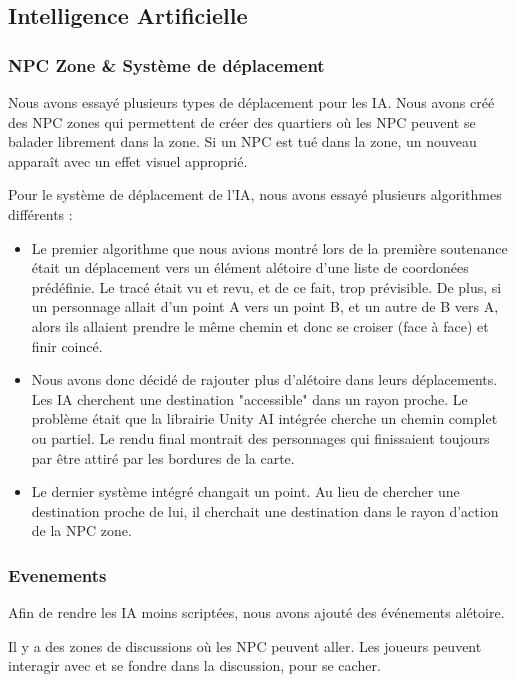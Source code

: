 

\subsection{Intelligence Artificielle}
    \subsubsection{NPC Zone \& Système de déplacement}
    Nous avons essayé plusieurs types de déplacement pour les IA.
    Nous avons créé des NPC zones qui permettent de créer des quartiers
    où les NPC peuvent se balader librement dans la zone.
    Si un NPC est tué dans la zone, un nouveau apparaît avec un effet visuel approprié.

    Pour le système de déplacement de l'IA,
    nous avons essayé plusieurs algorithmes différents :\newline
    
    \begin{itemize}
        \item Le premier algorithme que nous avions montré lors de la première soutenance
        était un déplacement vers un élément alétoire d'une liste de coordonées prédéfinie.
        Le tracé était vu et revu, et de ce fait, trop prévisible.
        De plus, si un personnage allait d'un point A vers un point B, et un autre de B vers A,
        alors ils allaient prendre le même chemin et donc se croiser (face à face) et finir coincé.
        \newline
        \item  Nous avons donc décidé de rajouter plus d'alétoire dans leurs déplacements.
        Les IA cherchent une destination "accessible" dans un rayon proche.
        Le problème était que la librairie Unity AI intégrée cherche un chemin complet ou partiel.
        Le rendu final montrait des personnages qui finissaient toujours par être attiré par les bordures de la carte.
        \newline

        \item    Le dernier système intégré changait un point.
        Au lieu de chercher une destination proche de lui, il cherchait une destination dans le rayon
        d'action de la NPC zone.
    
    \end{itemize}
    
   
    
    \subsubsection{Evenements}

    Afin de rendre les IA moins scriptées, nous avons ajouté des événements alétoire.
    
    Il y a des zones de discussions où les NPC peuvent aller.
    Les joueurs peuvent interagir avec et se fondre dans la discussion, pour se cacher.


    




